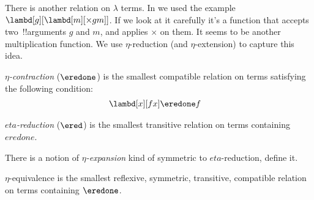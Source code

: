 \documentclass[../../../include/open-logic-section]{subfiles}
\begin{document}

There is another relation on $\lambda$ terms. In
 we used the example $\lambd[g][\lambd[m][\times g
m]]$. If we look at it carefully it's a function that accepts two~!!{argument}s
$g$ and $m$, and applies $\times$ on them. It seems to be another
multiplication function. We use $\eta$-reduction (and $\eta$-extension) to
capture this idea.

\begin{defn}
  \emph{$\eta$-contraction} ($\eredone$) is the smallest compatible relation
  on terms satisfying the following condition:
  \begin{align*}
    &\lambd[x][f x] \eredone f
  \end{align*}
\end{defn}

\begin{defn}
  \emph{$eta$-reduction} ($\ered$) is the smallest transitive relation on terms
  containing $eredone$.
\end{defn}

\begin{prob}
  There is a notion of \emph{$\eta$-expansion} kind of symmetric to
  $eta$-reduction, define it.
\end{prob}

\begin{defn}
  $\eta$-equivalence is the smallest reflexive, symmetric, transitive, compatible relation on terms containing $\eredone$.
\end{defn}
\end{document}
